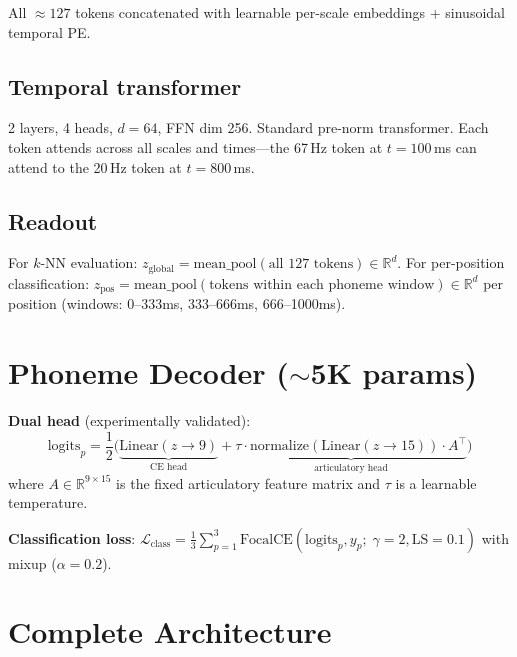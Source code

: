 \documentclass[11pt,letterpaper]{article}
\newcommand{\R}{\mathbb{R}}
\begin{document}
All ${\approx}127$ tokens concatenated with learnable per-scale embeddings + sinusoidal temporal PE.

\subsection{Temporal transformer}

2 layers, 4 heads, $d{=}64$, FFN dim 256. Standard pre-norm transformer. Each token attends across all scales and times---the 67\,Hz token at $t{=}100$\,ms can attend to the 20\,Hz token at $t{=}800$\,ms.

\subsection{Readout}

For $k$-NN evaluation: $z_{\text{global}} = \text{mean\_pool}(\text{all 127 tokens}) \in \R^d$. For per-position classification: $z_{\text{pos}} = \text{mean\_pool}(\text{tokens within each phoneme window}) \in \R^d$ per position (windows: 0--333ms, 333--666ms, 666--1000ms).


\section{Phoneme Decoder (${\sim}$5K params)}

\textbf{Dual head} (experimentally validated):
\begin{equation}
\text{logits}_p = \frac{1}{2}\bigl(\underbrace{\text{Linear}(z \to 9)}_{\text{CE head}} + \underbrace{\tau \cdot \text{normalize}(\text{Linear}(z \to 15)) \cdot A^\top}_{\text{articulatory head}}\bigr)
\end{equation}
where $A \in \R^{9 \times 15}$ is the fixed articulatory feature matrix and $\tau$ is a learnable temperature.

\textbf{Classification loss}:
$\mathcal{L}_{\text{class}} = \frac{1}{3}\sum_{p=1}^{3} \text{FocalCE}(\text{logits}_p, y_p;\; \gamma{=}2, \text{LS}{=}0.1)$
with mixup ($\alpha{=}0.2$).


\section{Complete Architecture}
\end{document}
